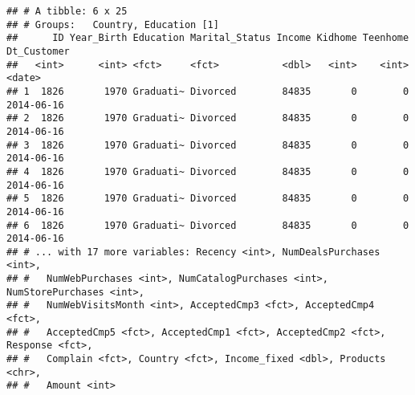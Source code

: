 \documentclass[]{article}
\newenvironment{Shaded}{\begin{snugshade}}{\end{snugshade}}
\newcommand{\CommentTok}[1]{\textcolor[rgb]{0.56,0.35,0.01}{\textit{#1}}}
\newcommand{\DataTypeTok}[1]{\textcolor[rgb]{0.13,0.29,0.53}{#1}}
\newcommand{\KeywordTok}[1]{\textcolor[rgb]{0.13,0.29,0.53}{\textbf{#1}}}
\newcommand{\NormalTok}[1]{#1}
\newcommand{\OperatorTok}[1]{\textcolor[rgb]{0.81,0.36,0.00}{\textbf{#1}}}
\newcommand{\StringTok}[1]{\textcolor[rgb]{0.31,0.60,0.02}{#1}}
\begin{document}
\begin{Shaded}
\end{Shaded}

\begin{verbatim}
## # A tibble: 6 x 25
## # Groups:   Country, Education [1]
##      ID Year_Birth Education Marital_Status Income Kidhome Teenhome Dt_Customer
##   <int>      <int> <fct>     <fct>           <dbl>   <int>    <int> <date>     
## 1  1826       1970 Graduati~ Divorced        84835       0        0 2014-06-16 
## 2  1826       1970 Graduati~ Divorced        84835       0        0 2014-06-16 
## 3  1826       1970 Graduati~ Divorced        84835       0        0 2014-06-16 
## 4  1826       1970 Graduati~ Divorced        84835       0        0 2014-06-16 
## 5  1826       1970 Graduati~ Divorced        84835       0        0 2014-06-16 
## 6  1826       1970 Graduati~ Divorced        84835       0        0 2014-06-16 
## # ... with 17 more variables: Recency <int>, NumDealsPurchases <int>,
## #   NumWebPurchases <int>, NumCatalogPurchases <int>, NumStorePurchases <int>,
## #   NumWebVisitsMonth <int>, AcceptedCmp3 <fct>, AcceptedCmp4 <fct>,
## #   AcceptedCmp5 <fct>, AcceptedCmp1 <fct>, AcceptedCmp2 <fct>, Response <fct>,
## #   Complain <fct>, Country <fct>, Income_fixed <dbl>, Products <chr>,
## #   Amount <int>
\end{verbatim}
\end{document}

